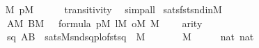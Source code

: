 \begin{isabellebody}
\isanewline
\ \ \isamarkupfalse%
\ {\isachardoublequoteopen}{\isasymsigma}{\isasymin}M{\isachardoublequoteclose}\ {\isachardoublequoteopen}p{\isasymin}M{\isachardoublequoteclose}\isanewline
\ \ \ \ \isamarkupfalse%
\ transitivity\ \isamarkupfalse%
\ simp{\isacharunderscore}{\kern0pt}all\isanewline
{}\isamarkupfalse%
%
\endisatagproof
{\isafoldproof}%
%
\isadelimproof
\isanewline
%
\endisadelimproof
\isanewline
{}\isamarkupfalse%
\ sats{\isacharunderscore}{\kern0pt}fst{\isacharunderscore}{\kern0pt}snd{\isacharunderscore}{\kern0pt}in{\isacharunderscore}{\kern0pt}M{\isacharcolon}{\kern0pt}\isanewline
\ \ \isanewline
\ \ \ \ {\isachardoublequoteopen}A{\isasymin}M{\isachardoublequoteclose}\ {\isachardoublequoteopen}B{\isasymin}M{\isachardoublequoteclose}\ {\isachardoublequoteopen}{\isasymphi}\ {\isasymin}\ formula{\isachardoublequoteclose}\ {\isachardoublequoteopen}p{\isasymin}M{\isachardoublequoteclose}\ {\isachardoublequoteopen}l{\isasymin}M{\isachardoublequoteclose}\ {\isachardoublequoteopen}o{\isasymin}M{\isachardoublequoteclose}\ {\isachardoublequoteopen}{\isasymchi}{\isasymin}M{\isachardoublequoteclose}\isanewline
\ \ \ \ {\isachardoublequoteopen}arity{\isacharparenleft}{\kern0pt}{\isasymphi}{\isacharparenright}{\kern0pt}\ {\isasymle}\ {}{\isachardoublequoteclose}\isanewline
\ \ \isanewline
\ \ \ \ {\isachardoublequoteopen}{\isacharbraceleft}{\kern0pt}sq\ {\isasymin}A{\isasymtimes}B\ {\isachardot}{\kern0pt}\ sats{\isacharparenleft}{\kern0pt}M{\isacharcomma}{\kern0pt}{\isasymphi}{\isacharcomma}{\kern0pt}{\isacharbrackleft}{\kern0pt}snd{\isacharparenleft}{\kern0pt}sq{\isacharparenright}{\kern0pt}{\isacharcomma}{\kern0pt}p{\isacharcomma}{\kern0pt}l{\isacharcomma}{\kern0pt}o{\isacharcomma}{\kern0pt}fst{\isacharparenleft}{\kern0pt}sq{\isacharparenright}{\kern0pt}{\isacharcomma}{\kern0pt}{\isasymchi}{\isacharbrackright}{\kern0pt}{\isacharparenright}{\kern0pt}{\isacharbraceright}{\kern0pt}\ {\isasymin}\ M{\isachardoublequoteclose}\isanewline
\ \ \ \ {\isacharparenleft}{\kern0pt}\ {\isachardoublequoteopen}{\isacharquery}{\kern0pt}{\isasymtheta}\ {\isasymin}\ M{\isachardoublequoteclose}{\isacharparenright}{\kern0pt}\isanewline
%
\isadelimproof
%
\endisadelimproof
%
\isatagproof
{}\isamarkupfalse%
\ {\isacharminus}{\kern0pt}\isanewline
\ \ \isamarkupfalse%
\ {\isachardoublequoteopen}{}{\isasymin}nat{\isachardoublequoteclose}\ {\isachardoublequoteopen}{}{\isasymin}nat{\isachardoublequoteclose}\ \isamarkupfalse%

\end{isabellebody}
